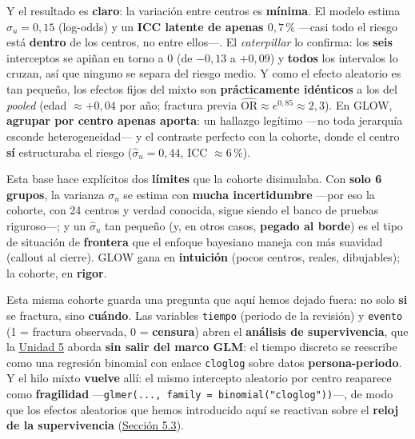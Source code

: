 \documentclass[
  letterpaper,
  DIV=11,
  numbers=noendperiod]{scrartcl}
\begin{document}
Y el resultado es \textbf{claro}: la variación entre centros es
\textbf{mínima}. El modelo estima \(\hat\sigma_u=0{,}15\) (log-odds) y
un \textbf{ICC latente de apenas \(0{,}7\,\%\)} ---casi todo el riesgo
está \textbf{dentro} de los centros, no entre ellos---. El
\emph{caterpillar} lo confirma: los \textbf{seis} interceptos se apiñan
en torno a \(0\) (de \(-0{,}13\) a \(+0{,}09\)) y \textbf{todos} los
intervalos lo cruzan, así que ninguno se separa del riesgo medio. Y como
el efecto aleatorio es tan pequeño, los efectos fijos del mixto son
\textbf{prácticamente idénticos} a los del \emph{pooled} (edad
\(\approx+0{,}04\) por año; fractura previa
\(\widehat{\text{OR}}\approx e^{0{,}85}\!\approx\!2{,}3\)). En GLOW,
\textbf{agrupar por centro apenas aporta}: un hallazgo legítimo ---no
toda jerarquía esconde heterogeneidad--- y el contraste perfecto con la
cohorte, donde el centro \textbf{sí} estructuraba el riesgo
(\(\hat\sigma_u=0{,}44\), ICC \(\approx 6\,\%\)).

Esta base hace explícitos dos \textbf{límites} que la cohorte
disimulaba. Con \textbf{solo 6 grupos}, la varianza \(\sigma_u\) se
estima con \textbf{mucha incertidumbre} ---por eso la cohorte, con 24
centros y verdad conocida, sigue siendo el banco de pruebas riguroso---;
y un \(\hat\sigma_u\) tan pequeño (y, en otros casos, \textbf{pegado al
borde}) es el tipo de situación de \textbf{frontera} que el enfoque
bayesiano maneja con más suavidad (callout al cierre). GLOW gana en
\textbf{intuición} (pocos centros, reales, dibujables); la cohorte, en
\textbf{rigor}.

\begin{tcolorbox}[enhanced jigsaw, breakable, colframe=quarto-callout-note-color-frame, left=2mm, arc=.35mm, colbacktitle=quarto-callout-note-color!10!white, toprule=.15mm, colback=white, coltitle=black, rightrule=.15mm, opacitybacktitle=0.6, title=\textcolor{quarto-callout-note-color}{\faInfo}\hspace{0.5em}{Puente a la Unidad 5}, titlerule=0mm, toptitle=1mm, bottomtitle=1mm, leftrule=.75mm, bottomrule=.15mm, opacityback=0]

Esta misma cohorte guarda una pregunta que aquí hemos dejado fuera: no
solo \textbf{si} se fractura, sino \textbf{cuándo}. Las variables
\texttt{tiempo} (periodo de la revisión) y \texttt{evento} (1 = fractura
observada, 0 = \textbf{censura}) abren el \textbf{análisis de
supervivencia}, que la \protect\hyperlink{sec-u15}{Unidad 5} aborda
\textbf{sin salir del marco GLM}: el tiempo discreto se reescribe como
una regresión binomial con enlace \texttt{cloglog} sobre datos
\textbf{persona-periodo}. Y el hilo mixto \textbf{vuelve} allí: el mismo
intercepto aleatorio por centro reaparece como \textbf{fragilidad}
---\texttt{glmer(...,\ family\ =\ binomial("cloglog"))}---, de modo que
los efectos aleatorios que hemos introducido aquí se reactivan sobre el
\textbf{reloj de la supervivencia}
(\protect\hyperlink{sec-u15-glm}{Sección 5.3}).

\end{tcolorbox}
\end{document}
